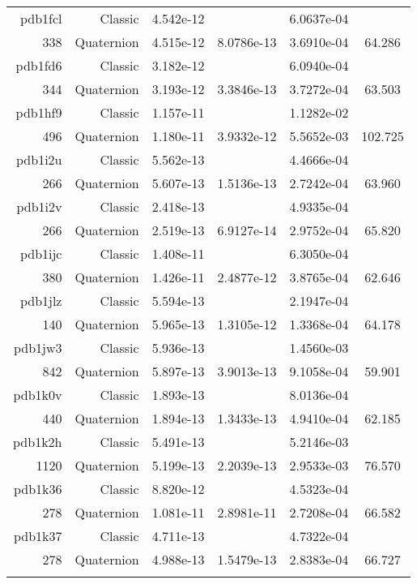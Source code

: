 \begin{xltabular}{\textwidth}{r|rS[table-format=1.3e+2]S[table-format=1.4e+2]S[table-format=1.4e+2]S[table-format=-1.3]}
pdb1fcl & Classic & 4.542e-12 &  & 6.0637e-04 & \\
338 & Quaternion & 4.515e-12 & 8.0786e-13 & 3.6910e-04 & 64.286\\  \addlinespace
pdb1fd6 & Classic & 3.182e-12 &  & 6.0940e-04 & \\
344 & Quaternion & 3.193e-12 & 3.3846e-13 & 3.7272e-04 & 63.503\\  \addlinespace
pdb1hf9 & Classic & 1.157e-11 &  & 1.1282e-02 & \\
496 & Quaternion & 1.180e-11 & 3.9332e-12 & 5.5652e-03 & 102.725\\  \addlinespace
pdb1i2u & Classic & 5.562e-13 &  & 4.4666e-04 & \\
266 & Quaternion & 5.607e-13 & 1.5136e-13 & 2.7242e-04 & 63.960\\  \addlinespace
pdb1i2v & Classic & 2.418e-13 &  & 4.9335e-04 & \\
266 & Quaternion & 2.519e-13 & 6.9127e-14 & 2.9752e-04 & 65.820\\  \addlinespace
pdb1ijc & Classic & 1.408e-11 &  & 6.3050e-04 & \\
380 & Quaternion & 1.426e-11 & 2.4877e-12 & 3.8765e-04 & 62.646\\  \addlinespace
pdb1jlz & Classic & 5.594e-13 &  & 2.1947e-04 & \\
140 & Quaternion & 5.965e-13 & 1.3105e-12 & 1.3368e-04 & 64.178\\  \addlinespace
pdb1jw3 & Classic & 5.936e-13 &  & 1.4560e-03 & \\
842 & Quaternion & 5.897e-13 & 3.9013e-13 & 9.1058e-04 & 59.901\\  \addlinespace
pdb1k0v & Classic & 1.893e-13 &  & 8.0136e-04 & \\
440 & Quaternion & 1.894e-13 & 1.3433e-13 & 4.9410e-04 & 62.185\\  \addlinespace
pdb1k2h & Classic & 5.491e-13 &  & 5.2146e-03 & \\
1120 & Quaternion & 5.199e-13 & 2.2039e-13 & 2.9533e-03 & 76.570\\  \addlinespace
pdb1k36 & Classic & 8.820e-12 &  & 4.5323e-04 & \\
278 & Quaternion & 1.081e-11 & 2.8981e-11 & 2.7208e-04 & 66.582\\  \addlinespace
pdb1k37 & Classic & 4.711e-13 &  & 4.7322e-04 & \\
278 & Quaternion & 4.988e-13 & 1.5479e-13 & 2.8383e-04 & 66.727\\  \addlinespace

\end{xltabular}
